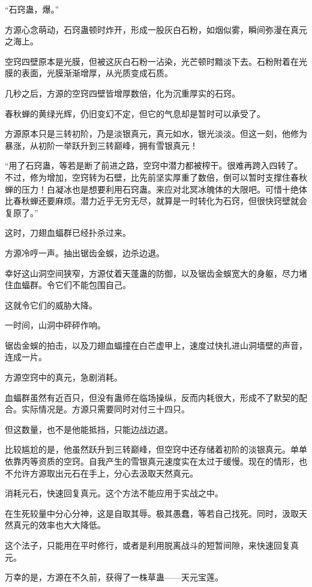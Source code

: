 \begin{this_body}
“石窍蛊，爆。”

方源心念萌动，石窍蛊顿时炸开，形成一股灰白石粉，如烟似雾，瞬间弥漫在真元之海上。

空窍四壁原本是光膜，但被这灰白石粉一沾染，光芒顿时黯淡下去。石粉附着在光膜的表面，光膜渐渐增厚，从光质变成石质。

几秒之后，方源的空窍四壁皆增厚数倍，化为沉重厚实的石窍。

春秋蝉的黄绿光辉，仍旧变幻不定，但它的气息却是暂时可以承受了。

方源原本只是三转初阶，乃是淡银真元，真元如水，银光淡淡。但这一刻，他修为暴涨，从初阶一举跃升到三转巅峰，拥有雪银真元！

“用了石窍蛊，等若是断了前进之路，空窍中潜力都被榨干。很难再跨入四转了。不过，修为增加，空窍转为石壁，比先前坚实厚重了数倍，倒可以暂时支撑住春秋蝉的压力！白凝冰也是想要利用石窍蛊。来应对北冥冰魄体的大限吧。可惜十绝体比春秋蝉还要麻烦。潜力近乎无穷无尽，就算是一时转化为石窍，但很快窍壁就会复原了。”

这时，刀翅血蝠群已经扑杀过来。

方源冷哼一声。抽出锯齿金蜈，边杀边退。

幸好这山洞空间狭窄，方源仗着天蓬蛊的防御，以及锯齿金蜈宽大的身躯，尽力堵住血蝠群。令它们不能包围自己。

这就令它们的威胁大降。

一时间，山洞中砰砰作响。

锯齿金蜈的拍击，以及刀翅血蝠撞在白芒虚甲上，速度过快扎进山洞墙壁的声音，连成一片。

方源空窍中的真元，急剧消耗。

血蝠群虽然有近百只，但没有蛊师在临场操纵，反而内耗很大，形成不了默契的配合。实际情况是。方源只需要同时对付三十四只。

但这数量，也不是他能抵挡，只能边战边退。

比较尴尬的是，他虽然跃升到三转巅峰，但空窍中还存储着初阶的淡银真元。单单依靠丙等资质的空窍。自我产生的雪银真元速度实在太过于缓慢。现在的情形，也不允许方源取出元石在手上，分心去汲取天然真元。

消耗元石，快速回复真元。这个方法不能应用于实战之中。

在生死较量中分心分神，这是自取其辱。极其愚蠢，等若自己找死。同时，汲取天然真元的效率也大大降低。

这个法子，只能用在平时修行，或者是利用脱离战斗的短暂间隙，来快速回复真元。

万幸的是，方源在不久前，获得了一株草蛊——天元宝莲。


\end{this_body}
